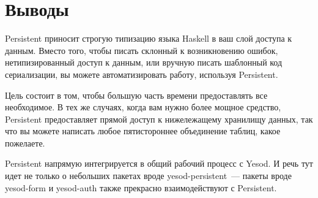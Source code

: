 \section{Выводы} %

Persistent приносит строгую типизацию языка Haskell в ваш слой доступа к данным. Вместо того, чтобы писать склонный к возникновению ошибок, нетипизированный доступ к данным, или вручную писать шаблонный код сериализации, вы можете автоматизировать работу, используя Persistent.

Цель состоит в том, чтобы большую часть времени предоставлять все необходимое. В тех же случаях, когда вам нужно более мощное средство, Persistent предоставляет прямой доступ к нижележащему хранилищу данных, так что вы можете написать любое пятистороннее объединение таблиц, какое пожелаете.

Persistent напрямую интегрируется в общий рабочий процесс с Yesod. И речь тут идет не только о небольших пакетах вроде yesod-persistent~--- пакеты вроде yesod-form и yesod-auth также прекрасно взаимодействуют с Persistent.  %
